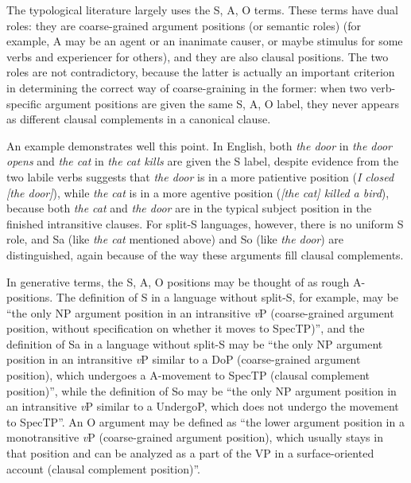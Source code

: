 \documentclass{article}
\newcommand*{\corpus}[1]{\emph{#1}}
\newcommand*{\vP}{\textit{v}P}
\begin{document}
The typological literature largely uses the S, A, O terms.
These terms have dual roles:
they are coarse-grained argument positions (or semantic roles)
(for example, A may be an agent or an inanimate causer, 
or maybe stimulus for some verbs and experiencer for others),
and they are also clausal positions.
The two roles are not contradictory, 
because the latter is actually an important criterion 
in determining the correct way of coarse-graining in the former:
when two verb-specific argument positions are given the same S, A, O label,
they never appears as different clausal complements in a canonical clause.

An example demonstrates well this point.
In English, both \corpus{the door} in \corpus{the door opens}
and \corpus{the cat} in \corpus{the cat kills} 
are given the S label,
despite evidence from the two labile verbs suggests that 
\corpus{the door} is in a more patientive position (\corpus{I closed [the door]}), 
while \corpus{the cat} is in a more agentive position (\corpus{[the cat] killed a bird}),
because both \corpus{the cat} and \corpus{the door} are in the typical subject position 
in the finished intransitive clauses.
For split-S languages, however, there is no uniform S role,
and Sa (like \corpus{the cat} mentioned above)
and So (like \corpus{the door})
are distinguished, 
again because of the way these arguments fill clausal complements.

In generative terms, the S, A, O positions may be thought of as rough A-positions. 
The definition of S in a language without split-S, for example, may be 
``the only NP argument position in an intransitive \vP{}
(coarse-grained argument position, without specification on whether it moves to SpecTP)'',
and the definition of Sa in a language without split-S may be 
``the only NP argument position in an intransitive \vP{} similar to a DoP (coarse-grained argument position),
which undergoes a A-movement to SpecTP (clausal complement position)'',
while the definition of So may be 
``the only NP argument position in an intransitive \vP{} similar to a UndergoP,
which does not undergo the movement to SpecTP''.
An O argument may be defined as ``the lower argument position in a monotransitive \vP{} 
(coarse-grained argument position),
which usually stays in that position and can be analyzed as a part of the VP in a surface-oriented account
(clausal complement position)''.
\end{document}
